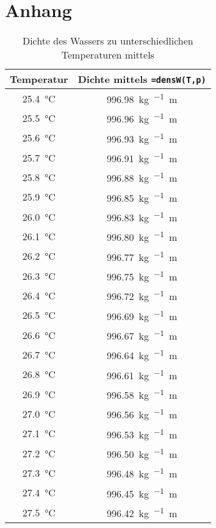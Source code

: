 \chapter*{Anhang}
\label{sec:anhang}

\vspace*{-2.5mm}
\renewcommand{\arraystretch}{1.2}
\begin{table}[h!]
	\centering
	\caption{Dichte des Wassers zu unterschiedlichen Temperaturen mittels \cite{BernhardSpang.2002}}
	\label{tab:dichte}
	\begin{tabulary}{\textwidth}{C|C}
		\hline
		\textbf{Temperatur} & \textbf{Dichte mittels \texttt{=densW(T,p)}} \\ 
		\hline
		\SI{25,4}{\celsius} & \SI{996,98}{\kg\per{}\meter} \\
		\SI{25,5}{\celsius} & \SI{996,96}{\kg\per{}\meter} \\
		\SI{25,6}{\celsius} & \SI{996,93}{\kg\per{}\meter} \\
		\SI{25,7}{\celsius} & \SI{996,91}{\kg\per{}\meter} \\
		\SI{25,8}{\celsius} & \SI{996,88}{\kg\per{}\meter} \\
		\SI{25,9}{\celsius} & \SI{996,85}{\kg\per{}\meter} \\
		\SI{26,0}{\celsius} & \SI{996,83}{\kg\per{}\meter} \\
		\SI{26,1}{\celsius} & \SI{996,80}{\kg\per{}\meter} \\
		\SI{26,2}{\celsius} & \SI{996,77}{\kg\per{}\meter} \\
		\SI{26,3}{\celsius} & \SI{996,75}{\kg\per{}\meter} \\
		\SI{26,4}{\celsius} & \SI{996,72}{\kg\per{}\meter} \\
		\SI{26,5}{\celsius} & \SI{996,69}{\kg\per{}\meter} \\
		\SI{26,6}{\celsius} & \SI{996,67}{\kg\per{}\meter} \\
		\SI{26,7}{\celsius} & \SI{996,64}{\kg\per{}\meter} \\
		\SI{26,8}{\celsius} & \SI{996,61}{\kg\per{}\meter} \\
		\SI{26,9}{\celsius} & \SI{996,58}{\kg\per{}\meter} \\
		\SI{27,0}{\celsius} & \SI{996,56}{\kg\per{}\meter} \\
		\SI{27,1}{\celsius} & \SI{996,53}{\kg\per{}\meter} \\
		\SI{27,2}{\celsius} & \SI{996,50}{\kg\per{}\meter} \\
		\SI{27,3}{\celsius} & \SI{996,48}{\kg\per{}\meter} \\
		\SI{27,4}{\celsius} & \SI{996,45}{\kg\per{}\meter} \\
		\SI{27,5}{\celsius} & \SI{996,42}{\kg\per{}\meter} \\
		\hline
	\end{tabulary}
\end{table}
\FloatBarrier
\vspace*{-2.5mm}
